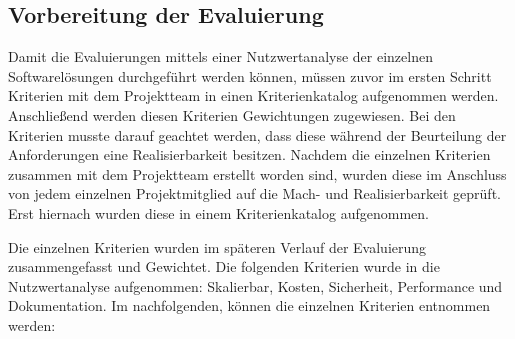 \subsection{Vorbereitung der Evaluierung}
\label{subsec:vorbereiten_der_evaluierung_datenvisualisierung}
Damit die Evaluierungen mittels einer Nutzwertanalyse der einzelnen
Softwarelösungen durchgeführt werden können, müssen zuvor im ersten Schritt
Kriterien mit dem Projektteam in einen Kriterienkatalog aufgenommen werden.
Anschließend werden diesen Kriterien Gewichtungen zugewiesen. Bei den Kriterien
musste darauf geachtet werden, dass diese während der Beurteilung der
Anforderungen eine Realisierbarkeit besitzen. Nachdem die einzelnen Kriterien
zusammen mit dem Projektteam erstellt worden sind, wurden diese im Anschluss
von jedem einzelnen Projektmitglied auf die Mach- und Realisierbarkeit geprüft.
Erst hiernach wurden diese in einem Kriterienkatalog aufgenommen.

Die einzelnen Kriterien wurden im späteren Verlauf der Evaluierung
zusammengefasst und Gewichtet. Die folgenden Kriterien wurde in die
Nutzwertanalyse aufgenommen: Skalierbar, Kosten, Sicherheit, Performance und
Dokumentation. Im nachfolgenden, können die einzelnen Kriterien entnommen
werden:


